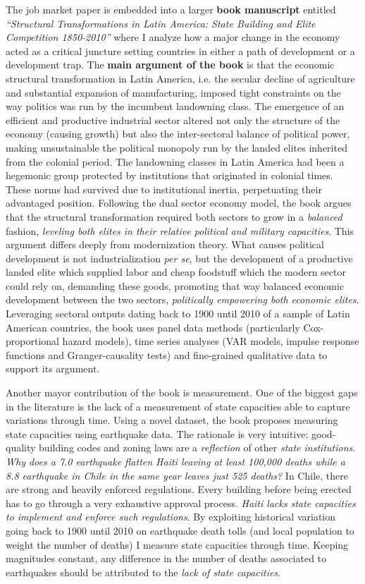 \documentclass[11pt]{letter} %
\begin{document}
\begin{letter}{}
The job market paper is embedded into a larger {\bf book manuscript} entitled \emph{``Structural Transformations in Latin America: State Building and Elite Competition 1850-2010''} where I analyze how a major change in the economy acted as a critical juncture setting countries in either a path of development or a development trap. The {\bf main argument of the book} is that the economic structural transformation in Latin America, i.e. the secular decline of agriculture and substantial expansion of manufacturing, imposed tight constraints on the way politics was run by the incumbent landowning class. The emergence of an efficient and productive industrial sector altered not only the structure of the economy (causing growth) but also the inter-sectoral balance of political power, making unsustainable the political monopoly run by the landed elites inherited from the colonial period. The landowning classes in Latin America had been a hegemonic group protected by institutions that originated in colonial times. These norms had survived due to institutional inertia, perpetuating their advantaged position. Following the dual sector economy model, the book argues that the structural transformation required both sectors to grow in a \emph{balanced} fashion, \emph{leveling both elites in their relative political and military capacities}. This argument differs deeply from modernization theory. What causes political development is not industrialization \emph{per se}, but the development of a productive landed elite which supplied labor and cheap foodstuff which the modern sector could rely on, demanding these goods, promoting that way balanced economic development between the two sectors, \emph{politically empowering both economic elites}. Leveraging sectoral outputs dating back to 1900 until 2010 of a sample of Latin American countries, the book uses panel data methods (particularly Cox-proportional hazard models), time series analyses (VAR models, impulse response functions and Granger-causality tests) and fine-grained qualitative data to support its argument.

Another mayor contribution of the book is measurement. One of the biggest gaps in the literature is the lack of a measurement of state capacities able to capture variations through time. Using a novel dataset, the book proposes measuring state capacities using earthquake data. The rationale is very intuitive: good-quality building codes and zoning laws are a \emph{reflection} of other \emph{state institutions}. \emph{Why does a 7.0 earthquake flatten Haiti leaving at least 100,000 deaths while a 8.8 earthquake in Chile in the same year leaves just 525 deaths?} In Chile, there are strong and heavily enforced regulations. Every building before being erected has to go through a very exhaustive approval process. \emph{Haiti lacks state capacities to implement and enforce such regulations}. By exploiting historical variation going back to 1900 until 2010 on earthquake death tolls (and local population to weight the number of deaths) I measure state capacities through time. Keeping magnitudes constant, any difference in the number of deaths associated to earthquakes should be attributed to the \emph{lack of state capacities}. 


\end{letter}
\end{document}
